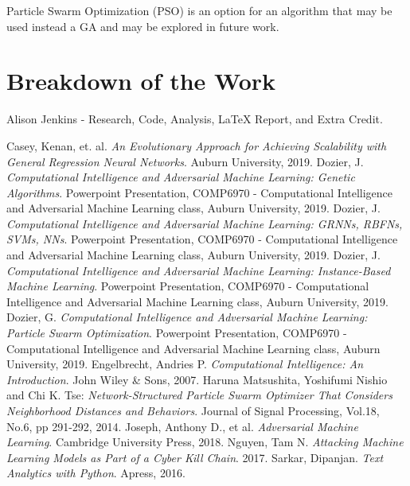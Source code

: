 \documentclass[conference]{IEEEtran}
\begin{document}
Particle Swarm Optimization (PSO) is an option for an algorithm that may be used instead a GA and may be explored in future work. 


\section{Breakdown of the Work}

Alison Jenkins - Research, Code, Analysis, {\LaTeX} Report, and Extra Credit. 

\begin{thebibliography}{00}
 Casey, Kenan, et. al. \textit{An Evolutionary Approach for Achieving Scalability with General Regression Neural Networks}. Auburn University, 2019.
 Dozier, J. \textit{Computational Intelligence and Adversarial Machine Learning: Genetic Algorithms}. Powerpoint Presentation, COMP6970 - Computational Intelligence and Adversarial Machine Learning class, Auburn University, 2019.
 Dozier, J. \textit{Computational Intelligence and Adversarial Machine Learning: GRNNs, RBFNs, SVMs, NNs}. Powerpoint Presentation, COMP6970 - Computational Intelligence and Adversarial Machine Learning class, Auburn University, 2019.
 Dozier, J. \textit{Computational Intelligence and Adversarial Machine Learning: Instance-Based Machine Learning}. Powerpoint Presentation, COMP6970 - Computational Intelligence and Adversarial Machine Learning class, Auburn University, 2019.
 Dozier, G. \textit{Computational Intelligence and Adversarial Machine Learning: Particle Swarm Optimization}. Powerpoint Presentation, COMP6970 - Computational Intelligence and Adversarial Machine Learning class, Auburn University, 2019.
 Engelbrecht, Andries P. \textit{Computational Intelligence: An Introduction}. John Wiley \& Sons, 2007.
 Haruna Matsushita, Yoshifumi Nishio and Chi K. Tse: \textit{Network-Structured Particle Swarm Optimizer That Considers Neighborhood Distances and Behaviors}. Journal of Signal Processing, Vol.18, No.6, pp 291-292, 2014.
 Joseph, Anthony D., et al. \textit{Adversarial Machine Learning}. Cambridge University Press, 2018.
 Nguyen, Tam N. \textit{Attacking Machine Learning Models as Part of a Cyber Kill Chain}. 2017.  %
 Sarkar, Dipanjan. \textit{Text Analytics with Python}. Apress, 2016.
\end{thebibliography}
\vspace{12pt}
\color{red}
\end{document}

